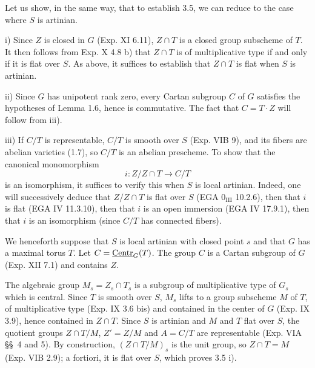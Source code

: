 Let us show, in the same way, that to establish 3.5, we can reduce to the case where $S$ is artinian.

i) Since $Z$ is closed in $G$ (Exp. XI 6.11), $Z\cap T$ is a closed group subscheme of $T$. It then follows from Exp. X 4.8 b) that $Z\cap T$ is of multiplicative type if and only if it is flat over $S$. As above, it suffices to establish that $Z\cap T$ is flat when $S$ is artinian.

ii) Since $G$ has unipotent rank zero, every Cartan subgroup $C$ of $G$ satisfies the hypotheses of Lemma 1.6, hence is commutative. The fact that $C=T\cdot Z$ will follow from iii).

iii) If $C/T$ is representable, $C/T$ is smooth over $S$ (Exp. VIB 9), and its fibers are abelian varieties (1.7), so $C/T$ is an abelian prescheme. To show that the canonical monomorphism
\[
i:Z/Z\cap T\longrightarrow C/T
\]
is an isomorphism, it suffices to verify this when $S$ is local artinian. Indeed, one will successively deduce that $Z/Z\cap T$ is flat over $S$ (EGA $0_{\mathrm{III}}$ 10.2.6), then that $i$ is flat (EGA IV 11.3.10), then that $i$ is an open immersion (EGA IV 17.9.1), then that $i$ is an isomorphism (since $C/T$ has connected fibers).

We henceforth suppose that $S$ is local artinian with closed point $s$ and that $G$ has a maximal torus $T$. Let $C=\underline{\mathrm{Centr}}_G(T)$. The group $C$ is a Cartan subgroup of $G$ (Exp. XII 7.1) and contains $Z$.

The algebraic group $M_s=Z_s\cap T_s$ is a subgroup of multiplicative type of $G_s$ which is central. Since $T$ is smooth over $S$, $M_s$ lifts to a group subscheme $M$ of $T$, of multiplicative type (Exp. IX 3.6 bis) and contained in the center of $G$ (Exp. IX 3.9), hence contained in $Z\cap T$. Since $S$ is artinian and $M$ and $T$ flat over $S$, the quotient groups $Z\cap T/M$, $Z'=Z/M$ and $A=C/T$ are representable (Exp. VIA \S\S\ 4 and 5). By construction, $(Z\cap T/M)_s$ is the unit group, so $Z\cap T=M$ (Exp. VIB 2.9); a fortiori, it is flat over $S$, which proves 3.5 i).

